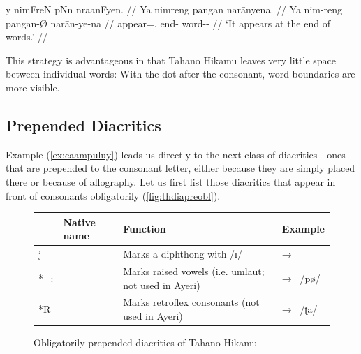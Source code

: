 \ex[everygla=\Tagati\Large,everyglb=\itshape]\begingl
	\gla y nimFreN\thafterdot{} pNn\thafterdot{} 
		nraanFyen. //
	\glb Ya nimreng pangan narānyena. //
	\glc Ya nim-reng pangan-Ø narān-ye-na //
	\glc \LocT{} appear=\TsgI{}.\Aarg{} end-\Top{} word-\Pl{}-\Gen{} //
	\glft `It appears at the end of words.' //
\endgl\xe

This strategy is advantageous in that Tahano Hikamu leaves very little space 
between individual words:  With the dot after the consonant, word boundaries are more visible.

\subsection{Prepended Diacritics}

Example (\ref{ex:caampuluy}) leads us directly to the next class of 
diacritics---ones that are prepended to the consonant letter, either because 
they are simply placed there or because of allography. Let us first list those 
diacritics that appear in front of consonants obligatorily 
(\autoref{fig:thdiapreobl}).

\begin{figure}[htp]
\caption{Obligatorily prepended diacritics of Tahano Hikamu}
\begin{tabu} to 
\toprule
\tableheaderfont

	& Native name
	& Function
	& Example
	\\
	
\toprule

*j
	& 
	& Marks a diphthong with /ɪ/
	&  → 
	\\
	
\midrule

*\_:
	& 
	& Marks raised vowels (i.e. umlaut; not used in Ayeri)
	&  → ~/pø/
	\\
	
\midrule

*R
	& 
	& Marks retroflex consonants (not used in Ayeri)\footnotemark
	&  → ~/ʈa/
	\\

\bottomrule
\end{tabu}
\label{fig:thdiapreobl}
\end{figure}

